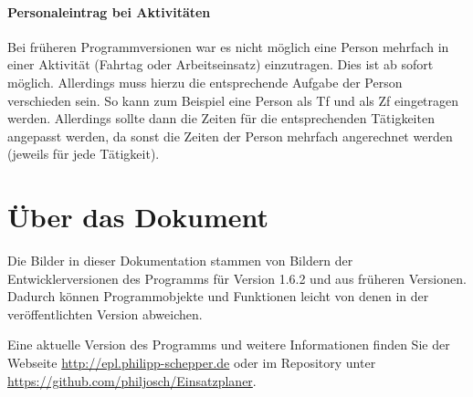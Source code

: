 \paragraph{Personaleintrag bei Aktivitäten}
Bei früheren Programmversionen war es nicht möglich eine Person mehrfach in einer Aktivität (Fahrtag oder Arbeitseinsatz) einzutragen.
Dies ist ab sofort möglich.
Allerdings muss hierzu die entsprechende Aufgabe der Person verschieden sein.
So kann zum Beispiel eine Person als Tf und als Zf eingetragen werden.
Allerdings sollte dann die Zeiten für die entsprechenden Tätigkeiten angepasst werden,
da sonst die Zeiten der Person mehrfach angerechnet werden (jeweils für jede Tätigkeit).




\section{Über das Dokument}
Die Bilder in dieser Dokumentation stammen von Bildern der Entwicklerversionen des Programms für Version 1.6.2 und aus früheren Versionen.
Dadurch können Programmobjekte und Funktionen leicht von denen in der veröffentlichten Version abweichen.

Eine aktuelle Version des Programms und weitere Informationen finden Sie der Webseite \url{http://epl.philipp-schepper.de}
oder im Repository unter \url{https://github.com/philjosch/Einsatzplaner}.
